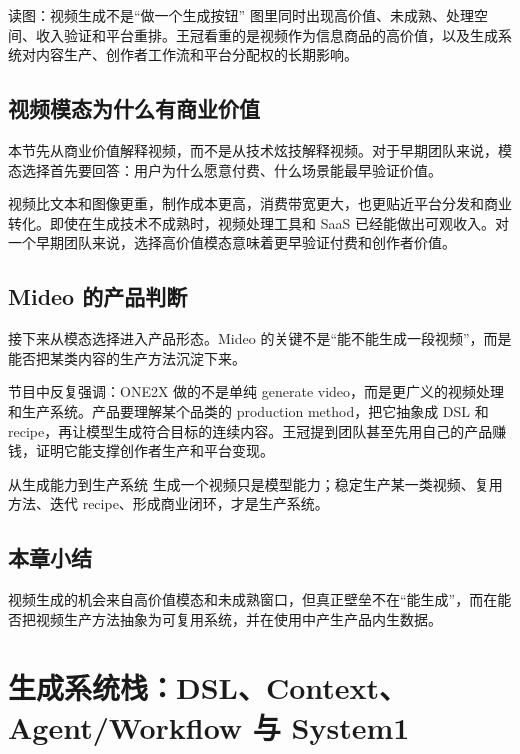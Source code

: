 \documentclass[a4paper]{article}
\begin{document}
\begin{knowledgebox}{读图：视频生成不是“做一个生成按钮”}
图里同时出现高价值、未成熟、处理空间、收入验证和平台重排。王冠看重的是视频作为信息商品的高价值，以及生成系统对内容生产、创作者工作流和平台分配权的长期影响。
\end{knowledgebox}

\subsection{视频模态为什么有商业价值}

本节先从商业价值解释视频，而不是从技术炫技解释视频。对于早期团队来说，模态选择首先要回答：用户为什么愿意付费、什么场景能最早验证价值。

视频比文本和图像更重，制作成本更高，消费带宽更大，也更贴近平台分发和商业转化。即使在生成技术不成熟时，视频处理工具和 SaaS 已经能做出可观收入。对一个早期团队来说，选择高价值模态意味着更早验证付费和创作者价值。

\subsection{Mideo 的产品判断}

接下来从模态选择进入产品形态。Mideo 的关键不是“能不能生成一段视频”，而是能否把某类内容的生产方法沉淀下来。

节目中反复强调：ONE2X 做的不是单纯 generate video，而是更广义的视频处理和生产系统。产品要理解某个品类的 production method，把它抽象成 DSL 和 recipe，再让模型生成符合目标的连续内容。王冠提到团队甚至先用自己的产品赚钱，证明它能支撑创作者生产和平台变现。

\begin{importantbox}{从生成能力到生产系统}
生成一个视频只是模型能力；稳定生产某一类视频、复用方法、迭代 recipe、形成商业闭环，才是生产系统。
\end{importantbox}

\subsection{本章小结}

视频生成的机会来自高价值模态和未成熟窗口，但真正壁垒不在“能生成”，而在能否把视频生产方法抽象为可复用系统，并在使用中产生产品内生数据。

\section{生成系统栈：DSL、Context、Agent/Workflow 与 System1}
\end{document}
